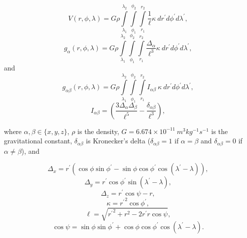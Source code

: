 \documentclass[manuscript,endfloat]{geophysics}
\begin{document}
\begin{equation}
    V(r,\phi,\lambda) = G \rho
        \int\limits_{\lambda_1}^{\lambda_2}
        \int\limits_{\phi_1}^{\phi_2}
        \int\limits_{r_1}^{r_2}
        \frac{1}{\ell}
        \kappa\  dr^\prime d\phi^\prime d\lambda^\prime,
    \label{eq:tesspot}
\end{equation}
\begin{equation}
    g_{\alpha}(r,\phi,\lambda) = G \rho
        \int\limits_{\lambda_1}^{\lambda_2}
        \int\limits_{\phi_1}^{\phi_2}
        \int\limits_{r_1}^{r_2}
        \frac{\Delta_\alpha}{\ell^3}
        \kappa\ dr^\prime d\phi^\prime d\lambda^\prime,
    \label{eq:tessgrav}
\end{equation}
\noindent
and
\begin{equation}
    g_{\alpha\beta}(r,\phi,\lambda) = G \rho
        \int\limits_{\lambda_1}^{\lambda_2}
        \int\limits_{\phi_1}^{\phi_2}
        \int\limits_{r_1}^{r_2}
        I_{\alpha\beta}
        \ \kappa\ dr^\prime d\phi^\prime d\lambda^\prime ,
    \label{eq:tesstensor}
\end{equation}
\begin{equation}
    I_{\alpha\beta} =
    \left(
        \frac{3\Delta_{\alpha} \Delta_{\beta}}{\ell^5} -
        \frac{\delta_{\alpha\beta}}{\ell^3}
    \right) ,
    \label{eq:tesstensorkernel}
\end{equation}

\noindent
where $\alpha, \beta \in \{x, y, z\}$,
$\rho$ is the density,
$G = 6.674\times10^{-11}\ m^3kg^{-1}s^{-1}$ is the gravitational constant,
$\delta_{\alpha\beta}$ is Kronecker's delta
($\delta_{\alpha\beta} = 1$ if $\alpha = \beta$
and $\delta_{\alpha\beta} = 0$ if $\alpha \neq \beta$),
and

\begin{equation}
    \Delta_x = r^\prime(\cos\phi\sin\phi^\prime - \sin\phi\cos\phi^\prime
               \cos(\lambda^\prime - \lambda)),
\end{equation}
\begin{equation}
    \Delta_y = r^\prime \cos \phi^\prime \sin(\lambda^\prime - \lambda),
\end{equation}
\begin{equation}
    \Delta_z = r^\prime \cos \psi - r,
\end{equation}
\begin{equation}
    \kappa = {r^\prime}^2 \cos \phi^\prime,
\end{equation}
\begin{equation}
    \ell = \sqrt{{r^\prime}^2 + r^2 - 2 r^\prime r \cos \psi},
\end{equation}
\begin{equation}
    \cos\psi = \sin\phi\sin\phi^\prime + \cos\phi\cos\phi^\prime
                 \cos(\lambda^\prime - \lambda).
\end{equation}
\end{document}
